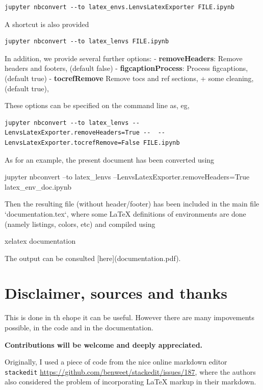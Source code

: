 \documentclass[11pt]{article}
\begin{document}
\begin{verbatim}
jupyter nbconvert --to latex_envs.LenvsLatexExporter FILE.ipynb
\end{verbatim}

A shortcut is also provided

\begin{verbatim}
jupyter nbconvert --to latex_lenvs FILE.ipynb
\end{verbatim}

In addition, we provide several further options: -
\textbf{removeHeaders}: Remove headers and footers, (default false) -
\textbf{figcaptionProcess}: Process figcaptions, (default true) -
\textbf{tocrefRemove} Remove tocs and ref sections, + some cleaning,
(default true),

These options can be specified on the command line as, eg,

\begin{verbatim}
jupyter nbconvert --to latex_lenvs --LenvsLatexExporter.removeHeaders=True --  --LenvsLatexExporter.tocrefRemove=False FILE.ipynb
\end{verbatim}

    \begin{example}
As for an example, the present document has been converted using
    
    jupyter nbconvert --to latex_lenvs --LenvsLatexExporter.removeHeaders=True latex_env_doc.ipynb
    
Then the resulting file (without header/footer) has been included in the main file `documentation.tex`, where some LaTeX definitions of environments are done (namely listings, colors, etc) and compiled using 
    
    xelatex documentation
    
The output can be consulted [here](documentation.pdf).    
\end{example}

    \section{Disclaimer, sources and
thanks}\label{disclaimer-sources-and-thanks}

    This is done in th ehope it can be useful. However there are many
impovements possible, in the code and in the documentation.

\textbf{Contributions will be welcome and deeply appreciated.}

Originally, I used a piece of code from the nice online markdown editor
\texttt{stackedit}
\url{https://github.com/benweet/stackedit/issues/187}, where the authors
also considered the problem of incorporating LaTeX markup in their
markdown.
\end{document}

